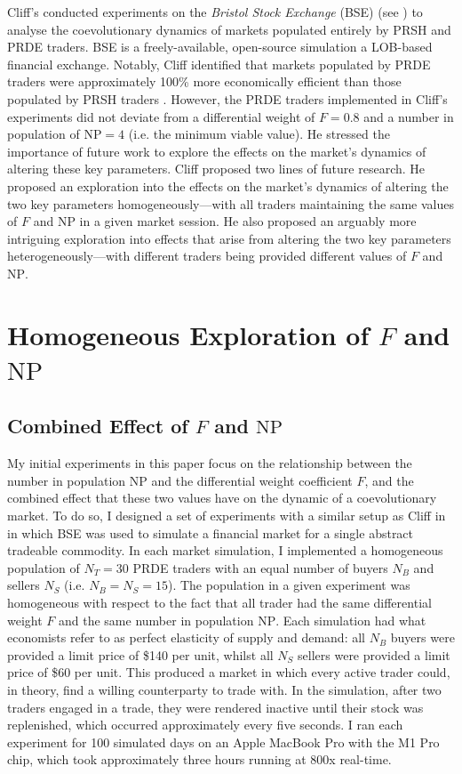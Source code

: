 \documentclass[conference]{IEEEtran}
\begin{document}
Cliff's conducted experiments on the \textit{Bristol Stock Exchange} (BSE) (see \cite{BSE, BSEPaper}) to analyse the coevolutionary dynamics of markets populated entirely by PRSH and PRDE traders.
BSE is a freely-available, open-source simulation a LOB-based financial exchange.
Notably, Cliff identified that markets populated by PRDE traders were approximately 100\% more economically efficient than those populated by PRSH traders \cite{PRDE}.
However, the PRDE traders implemented in Cliff's experiments did not deviate from a differential weight of $F=0.8$ and a number in population of $\mathrm{NP}=4$ (i.e. the minimum viable value).
He stressed the importance of future work to explore the effects on the market's dynamics of altering these key parameters.
Cliff proposed two lines of future research.
He proposed an exploration into the effects on the market's dynamics of altering the two key parameters homogeneously---with all traders maintaining the same values of $F$ and $\mathrm{NP}$ in a given market session.
He also proposed an arguably more intriguing exploration into effects that arise from altering the two key parameters heterogeneously---with different traders being provided different values of $F$ and $\mathrm{NP}$.

\section{Homogeneous Exploration of $F$ and $\mathrm{NP}$}

\subsection{Combined Effect of $F$ and $\mathrm{NP}$}

My initial experiments in this paper focus on the relationship between the number in population $\mathrm{NP}$ and the differential weight coefficient $F$, and the combined effect that these two values have on the dynamic of a coevolutionary market.
To do so, I designed a set of experiments with a similar setup as Cliff in \cite{PRDE} in which BSE was used to simulate a financial market for a single abstract tradeable commodity.
In each market simulation, I implemented a homogeneous population of $N_T=30$ PRDE traders with an equal number of buyers $N_B$ and sellers $N_S$ (i.e. $N_B=N_S=15$).
The population in a given experiment was homogeneous with respect to the fact that all trader had the same differential weight $F$ and the same number in population $\mathrm{NP}$.
Each simulation had what economists refer to as perfect elasticity of supply and demand: all $N_B$ buyers were provided a limit price of \$140 per unit, whilst all $N_S$ sellers were provided a limit price of \$60 per unit.
This produced a market in which every active trader could, in theory, find a willing counterparty to trade with.
In the simulation, after two traders engaged in a trade, they were rendered inactive until their stock was replenished, which occurred approximately every five seconds.
I ran each experiment for 100 simulated days on an Apple MacBook Pro with the M1 Pro chip, which took approximately three hours running at 800x real-time.
\end{document}
